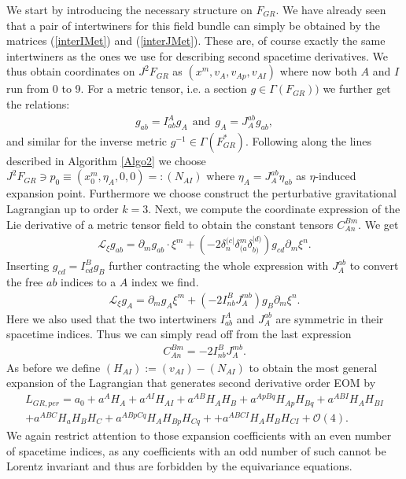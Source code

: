 \documentclass[a4paper,12pt, DIV=14, BCOR=5mm, twoside, headsepline, numbers=noenddot]{scrbook}
\begin{document}
We start by introducing the necessary structure on $F_{GR}$. We have already seen that a pair of intertwiners for this field bundle can simply be obtained by the matrices  (\ref{interIMet}) and (\ref{interJMet}). These are, of course exactly the same intertwiners as the ones we use for describing second spacetime derivatives. We thus obtain coordinates on $J^2F_{GR}$ as $(x^m,v_A,v_{Ap},v_{AI})$ where now both $A$ and $I$ run from 0 to 9. For a metric tensor, i.e. a section $g \in \Gamma(F_{GR}))$ we further get the relations:
\begin{align}
    g_{ab} = I^A _{ab} g_A \ \ \text{and} \ \ g_A = J^{ab}_{A} g_{ab},
\end{align}
and similar for the inverse metric $g^{-1} \in \Gamma(F_{GR}^{\ast})$.
Following along the lines described in Algorithm \ref{Algo2} we choose $J^2F_{GR} \ni p_0 \equiv (x_0^m,\eta_A,0,0) =: (N_{AI})$ where $\eta_A = J^{ab}_A \eta_{ab}$ as $\eta$-induced expansion point. Furthermore we choose construct the perturbative gravitational Lagrangian up to order $k=3$. 
Next, we compute the coordinate expression of the Lie derivative of a metric tensor field to obtain the constant tensors $C_{An}^{Bm}$. We get
\begin{align}
    \mathcal{L}_{\xi} g_{ab} = \partial_m g_{ab} \cdot \xi^m + \left (-2 \delta_n^{(c\vert} \delta_{(a}^m \delta_{b)}^{\vert d)} \right ) g_{cd} \partial_m \xi^n.
\end{align}
Inserting $g_{cd} = I^B_{cd} g_B$ further contracting the whole expression with $J^{ab}_A$ to convert the free $ab$ indices to a $A$ index we find.
\begin{align}
    \mathcal{L}_{\xi} g_A = \partial_m g_A \xi^m + \left (-2 I^B_{nb}J^{mb}_{A} \right )g_B \partial_m \xi ^n. 
\end{align}
Here we also used that the two intertwiners $I^A_{ab}$ and $J_A^{ab}$ are symmetric in their spacetime indices. Thus we can simply read off from the last expression
\begin{align}
    C_{An}^{Bm} = -2 I^B_{nb}J_A^{mb}.
\end{align}
As before we define $(H_{AI}) := (v_{AI}) - (N_{AI})$ to obtain the most general expansion of the Lagrangian that generates second derivative order EOM by
\begin{align}\label{LGR}
    L_{GR,per} =  a_0 + a^A H_A + a^{AI}H_{AI} + a^{AB} H_{A}H_{B} + a^{ApBq} H_{Ap}H_{Bq} + a^{ABI} H_{A} H_{BI} \\
    + a^{ABC} H_a H_B H_C + a^{ABpCq} H_{A}H_{Bp}H_{Cq} +
    + a^{ABCI} H_A H_B H_{CI} 
    + \mathcal{O}(4).
\end{align}
We again restrict attention to those expansion coefficients with an even number of spacetime indices, as any coefficients with an odd number of such cannot be Lorentz invariant and thus are forbidden by the equivariance equations.
\end{document}
